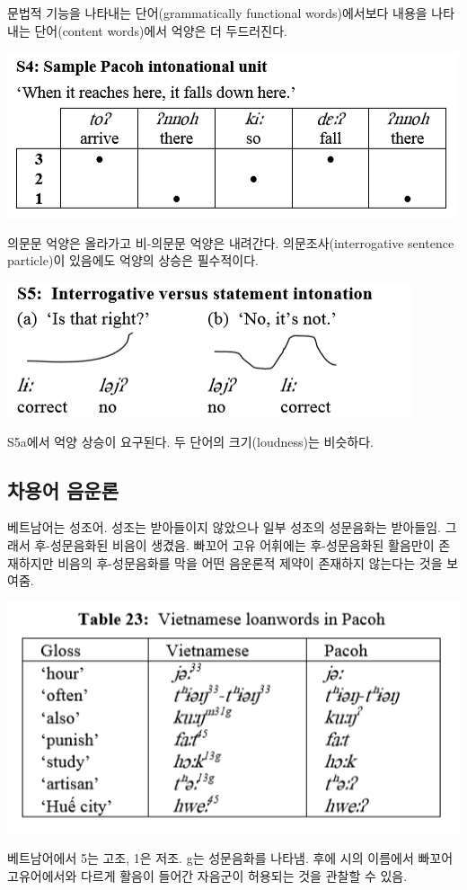 문법적 기능을 나타내는 단어(grammatically functional words)에서보다 내용을 나타내는 단어(content words)에서 억양은 더 두드러진다.

\includegraphics{Pacoh/src/PacohS4.png}

의문문 억양은 올라가고 비-의문문 억양은 내려간다. 의문조사(interrogative sentence particle)이 있음에도 억양의 상승은 필수적이다. 

\includegraphics{Pacoh/src/PacohS5.png}

S5a에서 억양 상승이 요구된다. 두 단어의 크기(loudness)는 비슷하다.

\subsection{차용어 음운론}
베트남어는 성조어. 성조는 받아들이지 않았으나 일부 성조의 성문음화는 받아들임. 그래서 후-성문음화된 비음이 생겼음. 빠꼬어 고유 어휘에는 후-성문음화된 활음만이 존재하지만 비음의 후-성문음화를 막을 어떤 음운론적 제약이 존재하지 않는다는 것을 보여줌.

\includegraphics{Pacoh/src/PacohTable23.png}

베트남어에서 5는 고조, 1은 저조. g는 성문음화를 나타냄. 후에 시의 이름에서 빠꼬어 고유어에서와 다르게 활음이 들어간 자음군이 허용되는 것을 관찰할 수 있음.
